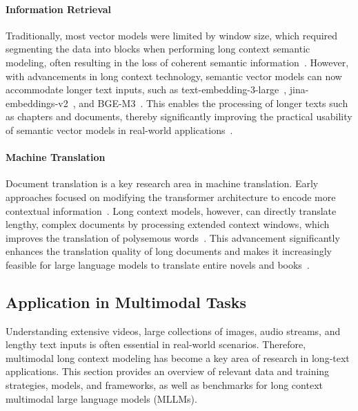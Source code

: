 \documentclass[11pt, a4paper, logo, copyright, nonumbering]{map}
\begin{document}
\paragraph{Information Retrieval}
Traditionally, most vector models were limited by window size, which required segmenting the data into blocks when performing long context semantic modeling, often resulting in the loss of coherent semantic information~\cite{zhu2023large,DBLP:conf/acl/WangYHYMW24}. However, with advancements in long context technology, semantic vector models can now accommodate longer text inputs, such as text-embedding-3-large~\cite{openai2024embedding}, jina-embeddings-v2~\cite{günther2024jinaembeddings28192token}, and BGE-M3~\cite{chen2024bge}. This enables the processing of longer texts such as chapters and documents, thereby significantly improving the practical usability of semantic vector models in real-world applications~\cite{DBLP:conf/emnlp/ZhuW0SWWL24,saad2024benchmarking}.
~\paragraph{Machine Translation}
Document translation is a key research area in machine translation. Early approaches focused on modifying the transformer architecture to encode more contextual information~\cite{miculicich2018document,zhang2018improving,bao2021g,DBLP:conf/emnlp/WangLJZY0T23}. Long context models, however, can directly translate lengthy, complex documents by processing extended context windows, which improves the translation of polysemous words~\cite{herold2023improving,wang2024benchmarking}. This advancement significantly enhances the translation quality of long documents and makes it increasingly feasible for large language models to translate entire novels and books~\cite{lyu2023paradigm}.


\subsection{Application in Multimodal Tasks}
Understanding extensive videos, large collections of images, audio streams, and lengthy text inputs is often essential in real-world scenarios. Therefore, multimodal long context modeling has become a key area of research in long-text applications. This section provides an overview of relevant data and training strategies, models, and frameworks, as well as benchmarks for long context multimodal large language models (MLLMs).
\end{document}
